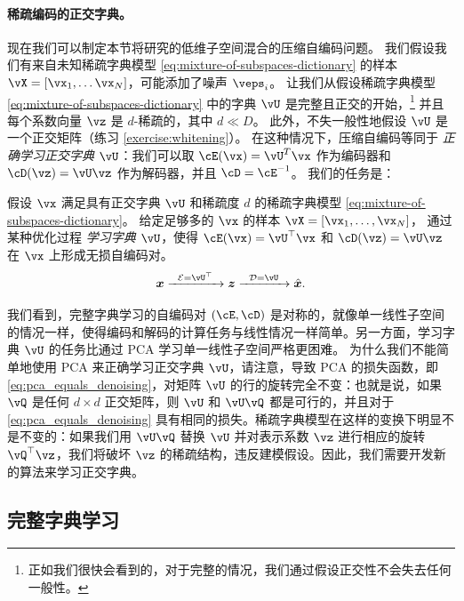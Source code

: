 \documentclass[../../book-main.tex]{subfiles}
\begin{document}
\paragraph{稀疏编码的正交字典。}
现在我们可以制定本节将研究的低维子空间混合的压缩自编码问题。
我们假设我们有来自未知稀疏字典模型 \eqref{eq:mixture-of-subspaces-dictionary} 的样本 $\vX = [\vx_1, \dots \vx_N]$，可能添加了噪声 $\veps_i$。
让我们从假设稀疏字典模型 \eqref{eq:mixture-of-subspaces-dictionary} 中的字典 $\vU$ 是完整且正交的开始，\footnote{正如我们很快会看到的，对于完整的情况，我们通过假设正交性不会失去任何一般性。} 并且每个系数向量 $\vz$ 是 $d$-稀疏的，其中 $d \ll D$。
此外，不失一般性地假设 $\vU$ 是一个正交矩阵（练习 \ref{exercise:whitening}）。
在这种情况下，压缩自编码等同于 \textit{正确学习正交字典 $\vU$}：我们可以取 $\cE(\vx) = \vU^T \vx$ 作为编码器和 $\cD(\vz) = \vU \vz$ 作为解码器，并且 $\cD = \cE^{-1}$。
我们的任务是：
\begin{tcolorbox}
    假设 $\vx$ 满足具有正交字典 $\vU$ 和稀疏度 $d$ 的稀疏字典模型 \eqref{eq:mixture-of-subspaces-dictionary}。
    给定足够多的 $\vx$ 的样本 $\vX = [\vx_1, \dots, \vx_N]$，
    通过某种优化过程 \textit{学习字典 $\vU$}，使得
    $\cE(\vx) = \vU^\top \vx$ 和 $\cD(\vz) = \vU \vz$ 在 $\vx$ 上形成无损自编码对。
\begin{equation}
\x \xrightarrow{\hspace{2mm} \mathcal{E} = \vU^\top \hspace{2mm}}  \z \xrightarrow{\hspace{2mm} \mathcal{D} = \vU \hspace{2mm}}   \hat{\x}.  
\label{eqn:autoencoding-DL}
\end{equation}    
\end{tcolorbox}
我们看到，完整字典学习的自编码对 $(\cE, \cD)$ 是对称的，就像单一线性子空间的情况一样，使得编码和解码的计算任务与线性情况一样简单。另一方面，学习字典 $\vU$ 的任务比通过 PCA 学习单一线性子空间严格更困难。
为什么我们不能简单地使用 PCA 来正确学习正交字典 $\vU$，请注意，导致 PCA 的损失函数，即 \eqref{eq:pca_equals_denoising}，对矩阵 $\vU$ 的行的旋转完全不变：也就是说，如果 $\vQ$ 是任何 $d \times d$ 正交矩阵，则 $\vU$ 和 $\vU \vQ$ 都是可行的，并且对于 \eqref{eq:pca_equals_denoising} 具有相同的损失。稀疏字典模型在这样的变换下明显不是不变的：如果我们用 $\vU \vQ$ 替换 $\vU$ 并对表示系数 $\vz$ 进行相应的旋转 $\vQ^\top \vz$，我们将破坏 $\vz$ 的稀疏结构，违反建模假设。因此，我们需要开发新的算法来学习正交字典。

\subsection{完整字典学习}
\label{sec:complete-dictionary}
\end{document}
